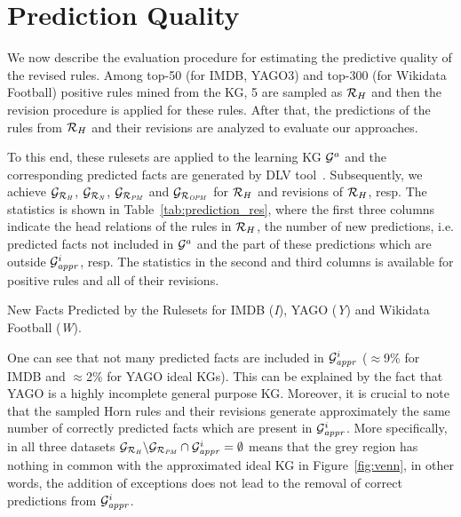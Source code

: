 \section{Prediction Quality}

We now describe the evaluation procedure for estimating the predictive quality of the revised rules. Among top-50 (for IMDB, YAGO3) and top-300 (for Wikidata Football) positive rules mined from the KG, 5 are sampled as $\mathcal{R}_H$ and then the revision procedure is applied for these rules. After that, the predictions of the rules from $\mathcal{R}_H$ and their revisions are analyzed to evaluate our approaches.

To this end, these rulesets are applied to the learning KG $\mathcal{G}^a$ and the corresponding predicted facts are generated by DLV tool~\cite{dlv}. Subsequently, we achieve $\mathcal{G}_{\mathcal{R}_{\mathit{H}}}$, $\mathcal{G}_{\mathcal{R}_{\mathit{N}}}$, $\mathcal{G}_{\mathcal{R}_{\mathit{PM}}}$ and $\mathcal{G}_{\mathcal{R}_{\mathit{OPM}}}$ for $\mathcal{R}_H$ and revisions of $\mathcal{R}_H$, resp. The statistics is shown in Table~\ref{tab:prediction_res}, where the first three columns indicate the head relations of the rules in $\mathcal{R}_H$, the number of new predictions, i.e. predicted facts not included in $\mathcal{G}^a$ and the part of these predictions which are outside $\mathcal{G}^i_{\mathit{appr}}$, resp. The statistics in the second and third columns is available for positive rules and all of their revisions.

\begin{table}[ht]
\centering

\smallskip
\caption{New Facts Predicted by the Rulesets for IMDB (\textit{I}), YAGO (\textit{Y}) and Wikidata Football (\textit{W}).}
\label{tab:prediction_res}
\end{table}

One can see that not many predicted facts are included in $\mathcal{G}^i_{\mathit{appr}}$ ($\approx$9\% for IMDB and $\approx$2\% for YAGO ideal KGs). This can be explained by the fact that YAGO is a highly incomplete general purpose KG. Moreover, it is crucial to note that the sampled Horn rules and their revisions generate approximately the same number of correctly predicted facts which are present in $\mathcal{G}^i_{\mathit{appr}}$. More specifically, in all three datasets $\mathcal{G}_{\mathit{\mathcal{R}_H}}\backslash \mathcal{G}_{\mathit{\mathcal{R}_{PM}}} \cap \mathcal{G}^i_{\mathit{appr}}=\emptyset$ means that the grey region has nothing in common with the approximated ideal KG in Figure~\ref{fig:venn}, in other words, the addition of exceptions does not lead to the removal of correct predictions from $\mathcal{G}^i_{\mathit{appr}}$.

